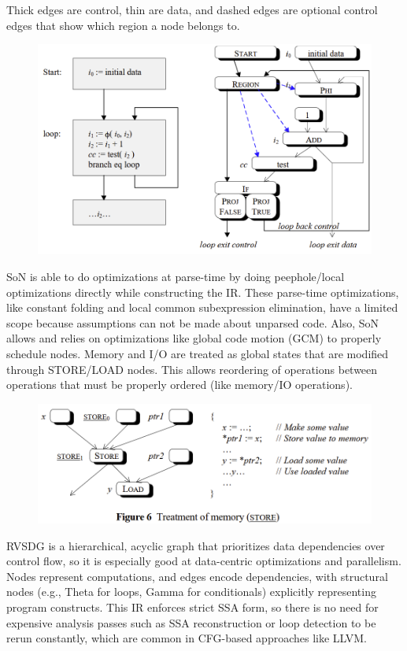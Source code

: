 \documentclass[11pt, a4paper, titlepage]{article}
\begin{document}
Thick edges are control, thin are data, and dashed edges are optional control edges that show which region a node belongs to.

\begin{figure}[H]
  \centering
  \includegraphics[scale=0.4]{images/r21.png}
\end{figure}

SoN is able to do optimizations at parse-time by doing peephole/local optimizations directly while constructing the IR. These parse-time optimizations, like constant folding and local common subexpression elimination, have a limited scope because assumptions can not be made about unparsed code. Also, SoN allows and relies on optimizations like global code motion (GCM) to properly schedule nodes. Memory and I/O are treated as global states that are modified through STORE/LOAD nodes. This allows reordering of operations between operations that must be properly ordered (like memory/IO operations).

\begin{figure}[H]
  \centering
  \includegraphics[scale=0.4]{images/r22.png}
\end{figure}

RVSDG is a hierarchical, acyclic graph that prioritizes data dependencies over control flow, so it is especially good at data-centric optimizations and parallelism. Nodes represent computations, and edges encode dependencies, with structural nodes (e.g., Theta for loops, Gamma for conditionals) explicitly representing program constructs. This IR enforces strict SSA form, so there is no need for expensive analysis passes such as SSA reconstruction or loop detection to be rerun constantly, which are common in CFG-based approaches like LLVM.
\end{document}
